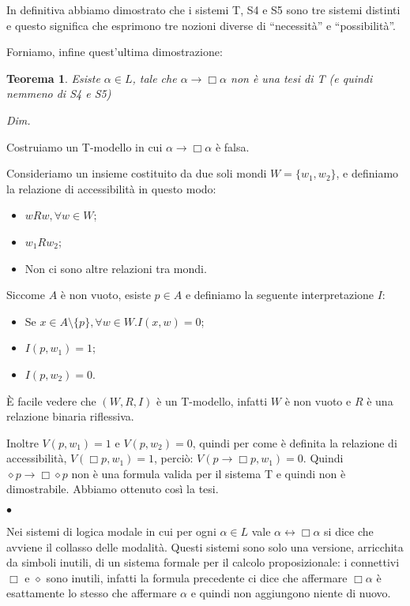 \documentclass[a4paper, titlepage, 12pt]{report}
\newtheorem{theorem}{Teorema}[chapter]
\newenvironment{proof}
    {\textit{Dim.}
    }
    {\begin{flushright}$\bullet$\end{flushright}
    }
\begin{document}
In definitiva abbiamo dimostrato che i sistemi T, S4 e S5 sono tre sistemi distinti
e questo significa che esprimono tre nozioni diverse di ``necessità'' e ``possibilità''.

Forniamo, infine quest'ultima dimostrazione:

\begin{theorem}
Esiste $\alpha \in L$, tale che $\alpha \rightarrow \Box \alpha$ non è una tesi di T (e quindi nemmeno di S4 e S5)
\end{theorem}

\begin{proof}

Costruiamo un T-modello in cui $\alpha \rightarrow \Box \alpha$ è falsa.

Consideriamo un insieme costituito da due soli mondi $W = \{w_1, w_2\}$, e definiamo la relazione di accessibilità
in questo modo:
\begin{itemize}
    \item $wRw, \forall w \in W$;
    \item $w_1Rw_2$;
    \item Non ci sono altre relazioni tra mondi.
\end{itemize}

Siccome $A$ è non vuoto, esiste $p \in A$ e definiamo la seguente interpretazione $I:$
\begin{itemize}
    \item Se $x \in A \setminus \{p\}, \forall w \in W. I(x, w) = 0$;
    \item $I(p, w_1) = 1$;
    \item $I(p, w_2) = 0$.
\end{itemize}


È facile vedere che $(W, R, I)$ è un T-modello, infatti $W$ è non vuoto e
$R$ è una relazione binaria riflessiva.

Inoltre $V(p, w_1) = 1$ e $V(p, w_2) = 0$, quindi per come è definita
la relazione di accessibilità, $V(\Box p, w_1) = 1$, perciò: $V(p \rightarrow \Box p, w_1) = 0$.
Quindi $\diamond p \rightarrow \Box\diamond p$ non è una formula valida per il sistema T e quindi
non è dimostrabile.
Abbiamo ottenuto così la tesi.

\end{proof}

Nei sistemi di logica modale in cui per ogni
$\alpha \in L$ vale $\alpha \leftrightarrow \Box \alpha$ si dice che avviene il collasso
delle modalità. Questi sistemi sono solo una versione, arricchita da simboli inutili,
di un sistema formale per il calcolo proposizionale:
i connettivi $\Box$ e $\diamond$ sono inutili, infatti la formula
precedente ci dice che affermare $\Box \alpha$ è esattamente lo stesso che affermare $\alpha$
e quindi non aggiungono niente di nuovo.
\end{document}
